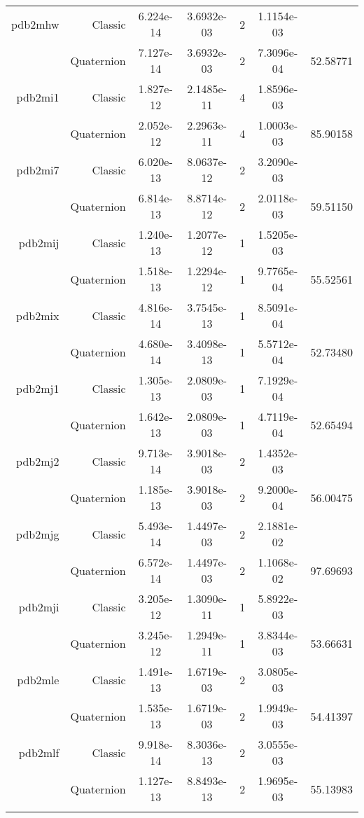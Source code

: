 \begin{xltabular}{\textwidth}{r|rS[table-format=1.3e+2]S[table-format=1.4e+2]cS[table-format=1.4e+2]S[table-format=-1.5]}
pdb2mhw & Classic & 6.224e-14 & 3.6932e-03 & 2 & 1.1154e-03 & \\
& Quaternion & 7.127e-14 & 3.6932e-03 & 2 & 7.3096e-04 & 52.58771\\  \addlinespace
pdb2mi1 & Classic & 1.827e-12 & 2.1485e-11 & 4 & 1.8596e-03 & \\
& Quaternion & 2.052e-12 & 2.2963e-11 & 4 & 1.0003e-03 & 85.90158\\  \addlinespace
pdb2mi7 & Classic & 6.020e-13 & 8.0637e-12 & 2 & 3.2090e-03 & \\
& Quaternion & 6.814e-13 & 8.8714e-12 & 2 & 2.0118e-03 & 59.51150\\  \addlinespace
pdb2mij & Classic & 1.240e-13 & 1.2077e-12 & 1 & 1.5205e-03 & \\
& Quaternion & 1.518e-13 & 1.2294e-12 & 1 & 9.7765e-04 & 55.52561\\  \addlinespace
pdb2mix & Classic & 4.816e-14 & 3.7545e-13 & 1 & 8.5091e-04 & \\
& Quaternion & 4.680e-14 & 3.4098e-13 & 1 & 5.5712e-04 & 52.73480\\  \addlinespace
pdb2mj1 & Classic & 1.305e-13 & 2.0809e-03 & 1 & 7.1929e-04 & \\
& Quaternion & 1.642e-13 & 2.0809e-03 & 1 & 4.7119e-04 & 52.65494\\  \addlinespace
pdb2mj2 & Classic & 9.713e-14 & 3.9018e-03 & 2 & 1.4352e-03 & \\
& Quaternion & 1.185e-13 & 3.9018e-03 & 2 & 9.2000e-04 & 56.00475\\  \addlinespace
pdb2mjg & Classic & 5.493e-14 & 1.4497e-03 & 2 & 2.1881e-02 & \\
& Quaternion & 6.572e-14 & 1.4497e-03 & 2 & 1.1068e-02 & 97.69693\\  \addlinespace
pdb2mji & Classic & 3.205e-12 & 1.3090e-11 & 1 & 5.8922e-03 & \\
& Quaternion & 3.245e-12 & 1.2949e-11 & 1 & 3.8344e-03 & 53.66631\\  \addlinespace
pdb2mle & Classic & 1.491e-13 & 1.6719e-03 & 2 & 3.0805e-03 & \\
& Quaternion & 1.535e-13 & 1.6719e-03 & 2 & 1.9949e-03 & 54.41397\\  \addlinespace
pdb2mlf & Classic & 9.918e-14 & 8.3036e-13 & 2 & 3.0555e-03 & \\
& Quaternion & 1.127e-13 & 8.8493e-13 & 2 & 1.9695e-03 & 55.13983\\  \addlinespace

\end{xltabular}
